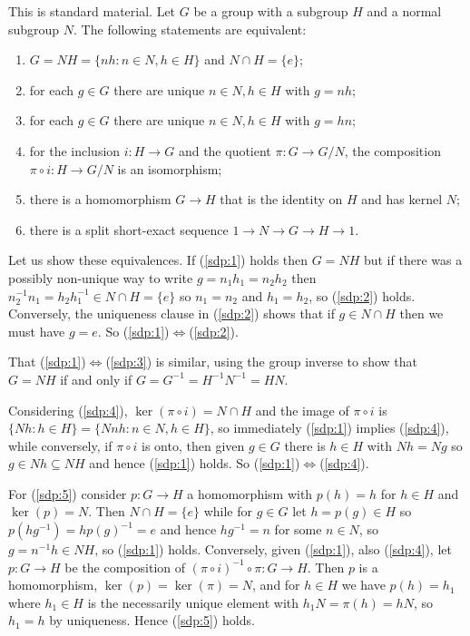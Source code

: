 \documentclass[twoside,a4paper,12pt]{article}
\theoremstyle{plain}
\theoremstyle{definition}
\begin{document}
This is standard material.  Let $G$ be a group with a subgroup $H$ and a normal subgroup $N$.
The following statements are equivalent:
\begin{enumerate}
\item\label{sdp:1} $G=NH = \{ nh : n\in N, h\in H \}$ and $N \cap H = \{e\}$;
\item\label{sdp:2} for each $g\in G$ there are unique $n\in N, h\in H$ with $g=nh$;
\item\label{sdp:3} for each $g\in G$ there are unique $n\in N, h\in H$ with $g=hn$;
\item\label{sdp:4} for the inclusion $i:H\rightarrow G$ and the quotient $\pi:G\rightarrow G/N$,
the composition $\pi\circ i:H\rightarrow G/N$ is an isomorphism;
\item\label{sdp:5} there is a homomorphism $G\rightarrow H$ that is the identity on $H$ and has
kernel $N$;
\item\label{sdp:6} there is a split short-exact sequence
$1 \rightarrow N \rightarrow G \rightarrow H \rightarrow 1$.
\end{enumerate}

Let us show these equivalences.  If (\ref{sdp:1}) holds then $G=NH$ but if there was a possibly
non-unique way to
write $g = n_1h_1 = n_2h_2$ then $n_2^{-1} n_1 = h_2 h_1^{-1} \in N\cap H=\{e\}$ so $n_1=n_2$ and
$h_1=h_2$, so (\ref{sdp:2}) holds.  Conversely, the uniqueness clause in (\ref{sdp:2}) shows that
if $g\in N\cap H$ then we must have $g=e$.  So (\ref{sdp:1})$\Leftrightarrow$(\ref{sdp:2}).

That (\ref{sdp:1})$\Leftrightarrow$(\ref{sdp:3}) is similar, using the group inverse to show that
$G=NH$ if and only if $G = G^{-1} = H^{-1} N^{-1} = HN$.

Considering (\ref{sdp:4}), $\ker(\pi\circ i) = N\cap H$ and the image of $\pi\circ i$ is $\{Nh :h\in H\}
= \{ Nnh : n\in N, h\in H \}$, so immediately (\ref{sdp:1}) implies (\ref{sdp:4}), while conversely,
if $\pi\circ i$ is onto, then given $g\in G$ there is $h\in H$ with $Nh = Ng$ so $g\in Nh \subseteq NH$
and hence (\ref{sdp:1}) holds.  So (\ref{sdp:1})$\Leftrightarrow$(\ref{sdp:4}).

For (\ref{sdp:5}) consider $p:G\rightarrow H$ a homomorphism with $p(h)=h$ for $h\in H$ and $\ker(p)=N$.
Then $N\cap H=\{e\}$ while for $g\in G$ let $h=p(g)\in H$ so $p(h g^{-1}) = h p(g)^{-1} = e$ and hence
$h g^{-1} = n$ for some $n\in N$, so $g = n^{-1} h \in NH$, so (\ref{sdp:1}) holds.
Conversely, given (\ref{sdp:1}), also (\ref{sdp:4}), let $p:G\rightarrow H$ be the composition of
$(\pi\circ i)^{-1} \circ \pi : G\rightarrow H$.  Then $p$ is a homomorphism, $\ker(p) = \ker(\pi) = N$,
and for $h\in H$ we have $p(h) = h_1$ where $h_1\in H$ is the necessarily unique element with
$h_1N = \pi(h) = hN$, so $h_1=h$ by uniqueness.  Hence (\ref{sdp:5}) holds.
\end{document}
